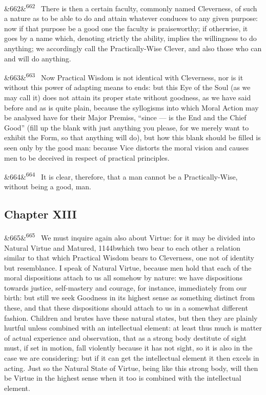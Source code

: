 \documentclass[12pt]{article}
\newcommand{\para}[1][]{\par\noindent\ifx&#1&\else\textsuperscript{\footnotesize #1}~\fi}
\begin{document}
\para[662] There is then a certain faculty, commonly named Cleverness, of such a nature as to be able to do and attain whatever conduces to any given purpose: now if that purpose be a good one the faculty is praiseworthy; if otherwise, it goes by a name which, denoting strictly the ability, implies the willingness to do anything; we accordingly call the Practically-Wise Clever, and also those who can and will do anything.

\para[663] Now Practical Wisdom is not identical with Cleverness, nor is it without this power of adapting means to ends: but this Eye of the Soul (as we may call it) does not attain its proper state without goodness, as we have said before and as is quite plain, because the syllogisms into which Moral Action may be analysed have for their Major Premiss, “since --- is the End and the Chief Good” (fill up the blank with just anything you please, for we merely want to exhibit the Form, so that anything will do), but how this blank should be filled is seen only by the good man: because Vice distorts the moral vision and causes men to be deceived in respect of practical principles.

\para[664] It is clear, therefore, that a man cannot be a Practically-Wise, without being a good, man.

\subsection*{Chapter XIII}

\para[665] We must inquire again also about Virtue: for it may be divided into Natural Virtue and Matured, 1144bwhich two bear to each other a relation similar to that which Practical Wisdom bears to Cleverness, one not of identity but resemblance. I speak of Natural Virtue, because men hold that each of the moral dispositions attach to us all somehow by nature: we have dispositions towards justice, self-mastery and courage, for instance, immediately from our birth: but still we seek Goodness in its highest sense as something distinct from these, and that these dispositions should attach to us in a somewhat different fashion. Children and brutes have these natural states, but then they are plainly hurtful unless combined with an intellectual element: at least thus much is matter of actual experience and observation, that as a strong body destitute of sight must, if set in motion, fall violently because it has not sight, so it is also in the case we are considering: but if it can get the intellectual element it then excels in acting. Just so the Natural State of Virtue, being like this strong body, will then be Virtue in the highest sense when it too is combined with the intellectual element.
\end{document}
